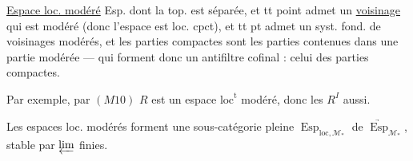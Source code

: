 \uline{Espace loc. modéré} Esp.   dont la top. est  séparée, et tt point admet un \uline{voisinage} qui est  modéré (donc l'espace est loc. cpct), et tt pt admet un syst. fond. de voisinages modérés, et les parties compactes sont les parties contenues dans une partie modérée --- qui forment donc un antifiltre cofinal : celui des parties compactes.

Par exemple, par $(M10)$ $R$ est un espace $\mathrm{loc}^{\mathrm t}$ modéré, donc les $R^I$ aussi.

Les espaces loc. modérés  forment une sous-catégorie pleine $\operatorname{Esp}_{\mathrm{loc},\mathcal M_*}$ de $\underrightarrow{\operatorname{Esp}}_{\mathcal M_*}$, stable par $\varprojlim$ finies.

